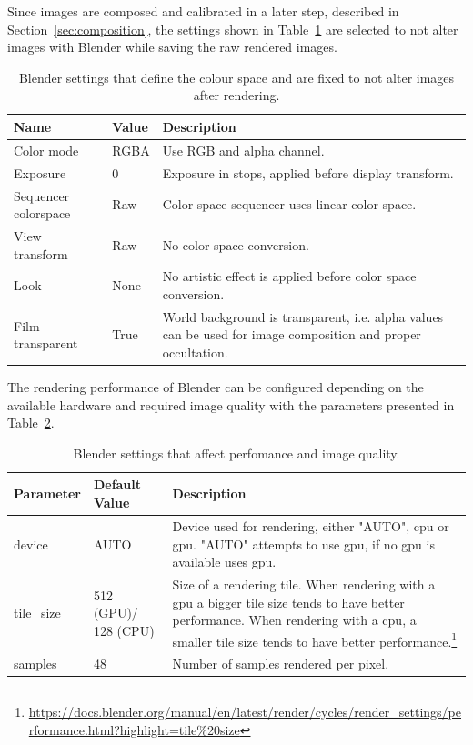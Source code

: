 Since images are composed and calibrated in a later step, described in Section~\ref{sec:composition}, the settings shown in Table~\ref{tab:color_space} are selected to not alter images with Blender while saving the raw rendered images.
\begin{table}[htb]
    \centering
    \caption{Blender settings that define the colour space and are fixed to not alter images after rendering.}
    \label{tab:color_space}
    \begin{tabular}{p{}|p{}|p{}}
        \textbf{Name}        & \textbf{Value} & \textbf{Description} \\ \hline
        Color mode           & RGBA           & Use RGB and alpha channel. \\
        Exposure             & 0              & Exposure in stops, applied before display transform. \\
        Sequencer colorspace & Raw            & Color space sequencer uses linear color space. \\
        View transform       & Raw            & No color space conversion. \\
        Look                 & None           & No artistic effect is applied before color space conversion. \\
        Film transparent     & True           & World background is transparent, i.e. alpha values can be used for image composition and proper occultation.
    \end{tabular}
\end{table}

The rendering performance of Blender can be configured depending on the available hardware and required image quality with the parameters presented in Table~\ref{tab:blender_settings_input}.
\begin{table}[htb]
    \centering
    \caption{Blender settings that affect perfomance and image quality.}
    \label{tab:blender_settings_input}
        \begin{tabular}{p{}|p{}|p{}}
        \textbf{Parameter} & \textbf{Default Value} & \textbf{Description} \\ \hline
        device & AUTO & Device used for rendering, either "AUTO", \gls{cpu} or \gls{gpu}. "AUTO" attempts to use \gls{gpu}, if no \gls{gpu} is available uses \gls{gpu}. \\
        tile\_size & 512 (GPU)/ 128 (CPU)  & Size of a rendering tile. When rendering with a \gls{gpu} a bigger tile size tends to have better performance. When rendering with a \gls{cpu}, a smaller tile size tends to have better performance.\footnote{\url{https://docs.blender.org/manual/en/latest/render/cycles/render\_settings/performance.html?highlight=tile\%20size}} \\
        samples & 48 & Number of samples rendered per pixel.\\
    \end{tabular}
\end{table}

